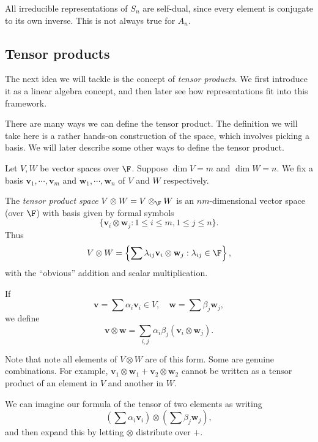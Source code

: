 \documentclass[a4paper]{article}
\begin{document}
\begin{eg}
  All irreducible representations of $S_n$ are self-dual, since every element is conjugate to its own inverse. This is not always true for $A_n$.
\end{eg}

\subsection{Tensor products}
The next idea we will tackle is the concept of \emph{tensor products}. We first introduce it as a linear algebra concept, and then later see how representations fit into this framework.

There are many ways we can define the tensor product. The definition we will take here is a rather hands-on construction of the space, which involves picking a basis. We will later describe some other ways to define the tensor product.

\begin{defi}
  Let $V, W$ be vector spaces over $\F$. Suppose $\dim V = m$ and $\dim W = n$. We fix a basis $\mathbf{v}_1, \cdots, \mathbf{v}_m$ and $\mathbf{w}_1, \cdots, \mathbf{w}_n$ of $V$ and $W$ respectively.

  The \emph{tensor product space} $V \otimes W = V\otimes_\F W$ is an $nm$-dimensional vector space (over $\F$) with basis given by formal symbols
  \[
    \{\mathbf{v}_i \otimes \mathbf{w}_j: 1\leq i \leq m, 1 \leq j \leq n\}.
  \]
  Thus
  \[
    V\otimes W = \left\{\sum \lambda_{ij} \mathbf{v}_i \otimes \mathbf{w}_j: \lambda_{ij} \in \F\right\},
  \]
  with the ``obvious'' addition and scalar multiplication.

  If
  \[
    \mathbf{v} = \sum \alpha_i \mathbf{v}_i \in V, \quad \mathbf{w} = \sum \beta_j \mathbf{w}_j,
  \]
  we define
  \[
    \mathbf{v} \otimes \mathbf{w} = \sum_{i, j} \alpha_i\beta_j (\mathbf{v}_i \otimes \mathbf{w}_j).
  \]
\end{defi}
Note that note all elements of $V\otimes W$ are of this form. Some are genuine combinations. For example, $\mathbf{v}_1 \otimes \mathbf{w}_1 + \mathbf{v}_2 \otimes \mathbf{w}_2$ cannot be written as a tensor product of an element in $V$ and another in $W$.

We can imagine our formula of the tensor of two elements as writing
\[
  \left(\sum \alpha_i \mathbf{v}_i\right) \otimes \left(\sum \beta_j \mathbf{w}_j\right),
\]
and then expand this by letting $\otimes$ distribute over $+$.
\end{document}
